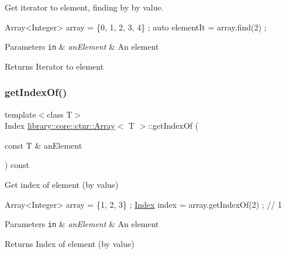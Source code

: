 Get iterator to element, finding by by value. 


\begin{DoxyCode}
Array<Integer> array = \{0, 1, 2, 3, 4\} ;
\textcolor{keyword}{auto} elementIt = array.find(2) ;
\end{DoxyCode}



\begin{DoxyParams}[1]{Parameters}
\mbox{\tt in}  & {\em an\+Element} & An element \\
\hline
\end{DoxyParams}
\begin{DoxyReturn}{Returns}
Iterator to element 
\end{DoxyReturn}
\mbox{\label{classlibrary_1_1core_1_1ctnr_1_1_array_aa8a3e2745d72db8181b42e3cfb55415c}} 
\subsubsection{\texorpdfstring{get\+Index\+Of()}{getIndexOf()}}
{\footnotesize\ttfamily template$<$class T$>$ \\
Index \hyperlink{classlibrary_1_1core_1_1ctnr_1_1_array}{library\+::core\+::ctnr\+::\+Array}$<$ T $>$\+::get\+Index\+Of (\begin{DoxyParamCaption}\item[{const T \&}]{an\+Element }\end{DoxyParamCaption}) const}



Get index of element (by value) 


\begin{DoxyCode}
Array<Integer> array = \{1, 2, 3\} ;
\hyperlink{namespacelibrary_1_1core_1_1types_ad87eeb821d7067ec94e06ed1980d6350}{Index} index = array.getIndexOf(2) ; \textcolor{comment}{// 1}
\end{DoxyCode}



\begin{DoxyParams}[1]{Parameters}
\mbox{\tt in}  & {\em an\+Element} & An element \\
\hline
\end{DoxyParams}
\begin{DoxyReturn}{Returns}
Index of element (by value) 
\end{DoxyReturn}
\mbox{\label{classlibrary_1_1core_1_1ctnr_1_1_array_a049307129c77f461b37ddca47edc7913}} 
